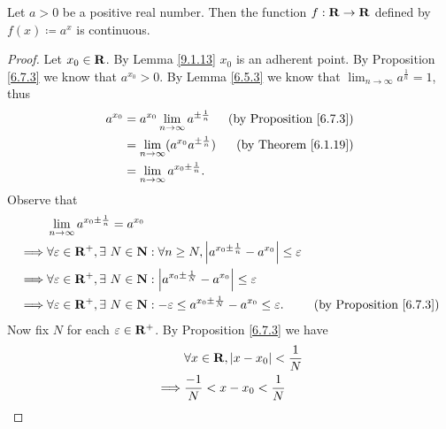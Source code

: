 \begin{proposition}\label{9.4.10}
    Let \(a > 0\) be a positive real number.
    Then the function \(f : \mathbf{R} \to \mathbf{R}\) defined by \(f(x) \coloneqq a^x\) is continuous.
\end{proposition}

\begin{proof}
    Let \(x_0 \in \mathbf{R}\).
    By Lemma \ref{9.1.13} \(x_0\) is an adherent point.
    By Proposition \ref{6.7.3} we know that \(a^{x_0} > 0\).
    By Lemma \ref{6.5.3} we know that \(\lim_{n \to \infty} a^{\frac{1}{n}} = 1\), thus
    \begin{align*}
        a^{x_0} & = a^{x_0} \lim_{n \to \infty} a^{\pm \frac{1}{n}}   & \text{(by Proposition \ref{6.7.3})} \\
                & = \lim_{n \to \infty} (a^{x_0} a^{\pm \frac{1}{n}}) & \text{(by Theorem \ref{6.1.19})}    \\
                & = \lim_{n \to \infty} a^{x_0 \pm \frac{1}{n}}.
    \end{align*}
    Observe that
    \begin{align*}
                 & \lim_{n \to \infty} a^{x_0 \pm \frac{1}{n}} = a^{x_0}                                                                                                              \\
        \implies & \forall \varepsilon \in \mathbf{R}^+, \exists\ N \in \mathbf{N} : \forall n \geq N, \left\lvert a^{x_0 \pm \frac{1}{n}} - a^{x_0}\right\rvert \leq \varepsilon                                       \\
        \implies & \forall \varepsilon \in \mathbf{R}^+, \exists\ N \in \mathbf{N} : \left\lvert a^{x_0 \pm \frac{1}{N}} - a^{x_0}\right\rvert \leq \varepsilon                                                         \\
        \implies & \forall \varepsilon \in \mathbf{R}^+, \exists\ N \in \mathbf{N} : -\varepsilon \leq a^{x_0 \pm \frac{1}{N}} - a^{x_0} \leq \varepsilon.      & \text{(by Proposition \ref{6.7.3})}
    \end{align*}
    Now fix \(N\) for each \(\varepsilon \in \mathbf{R}^+\).
    By Proposition \ref{6.7.3} we have
    \begin{align*}
                 & \forall x \in \R, \abs{x - x_0} < \frac{1}{N}                                                                                                              \\
        \implies & \frac{-1}{N} < x - x_0 < \frac{1}{N}                                                                                                                       \\

\end{align*}
\end{proof}

